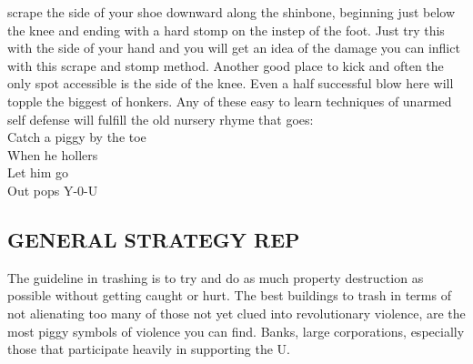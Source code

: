 \documentclass[11pt,twoside,a4paper]{book}
\begin{document}
scrape the side of your shoe downward along the shinbone, beginning just below the knee and ending with a hard stomp on the instep of the foot. Just try this with the side of your hand and you will get an idea of the damage you can inflict with this scrape and stomp method. Another good place to kick and often the only spot accessible is the side of the knee. Even a half successful blow here will topple the biggest of honkers. Any of these easy to learn techniques of unarmed self defense will fulfill the old nursery rhyme that goes:~\\
	Catch a piggy by the toe~\\
	When he hollers~\\
	Let him go~\\
	Out pops Y-0-U

\subsection{GENERAL STRATEGY REP}

	The guideline in trashing is to try and do as much property destruction as possible without getting caught or hurt. The best buildings to trash in terms of not alienating too many of those not yet clued into revolutionary violence, are the most piggy symbols of violence you can find. Banks, large corporations, especially those that participate heavily in supporting the U.~\\
\end{document}
